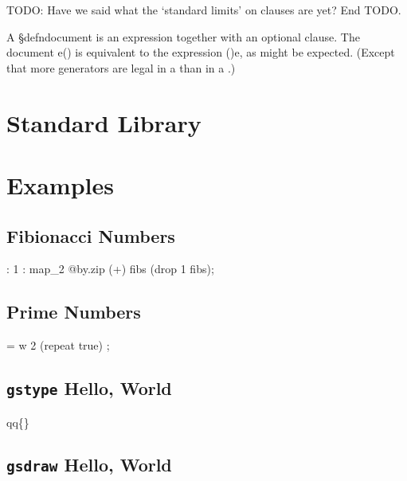 \documentclass{report}
\newcommand\qq[1]{qq\{\text{\texttt{#1}}\}}
\newcommand\sh[1]{\texttt{#1}}
\begin{document}
TODO: Have we said what the `standard limits' on \<\where\> clauses are yet?  End TODO.

A §defn{document} is an expression together with an optional \<\where\> clause.
The document \<e\;(\where\;)\> is equivalent to the expression \<\for\;\rec\;()\;e\>,
as might be expected.
(Except that more generators are legal in a \<\for\> than in a \<\where\>.)

\chapter{Standard Library}
\label{stdlib}

\chapter{Examples}

\section{Fibionacci Numbers}

\begin{haskell}
      : 1 : map_2 @by.zip (+) fibs (drop 1 fibs);
\end{haskell}

\section{Prime Numbers}

\begin{haskell}
     = w 2 (repeat true) ;
\end{haskell}

\section{\sh{gstype} Hello, World}

\begin{haskell}
    \qq{Hello, world!$\backslash$n}
\end{haskell}

\section{\sh{gsdraw} Hello, World}
\end{document}
